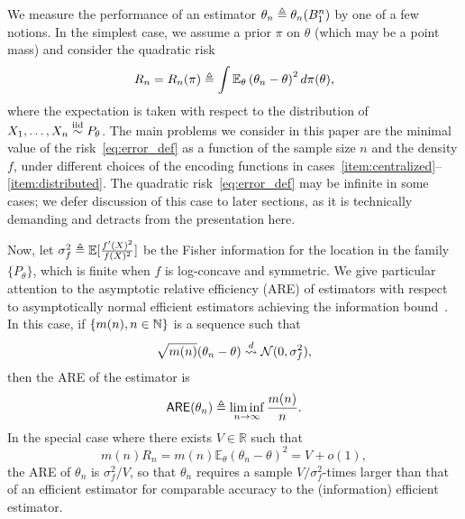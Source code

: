 We measure the performance of an estimator $\theta_n \triangleq
\theta_n(B_1^n)$ by one of a few notions. In the simplest case,
we assume a prior $\pi$ on $\theta$ (which may be a point
mass) and consider the quadratic risk
\begin{equation}
  \label{eq:error_def}
  R_n = R_n(\pi) \triangleq \int \mathbb{E}_\theta\left({\theta}_n - \theta \right)^2
  d\pi(\theta),
\end{equation}
where the expectation is taken with respect to the distribution of
$X_1,\ldots,X_n \stackrel{\textup{iid}}{\sim} P_\theta$.  The main problems we consider in this
paper are the minimal value of the risk~\eqref{eq:error_def} as a function
of the sample size $n$ and the density $f$, under different choices of the
encoding functions in
cases~\eqref{item:centralized}--\eqref{item:distributed}.
The quadratic risk~\eqref{eq:error_def} may be infinite in some cases;
we defer discussion of this case to later sections, as it is technically
demanding and detracts from the presentation here.

Now, let $\sigma_f^2 \triangleq \mathbb{E}[\frac{f'(X)^2}{f(X)^2}]$ be the Fisher
information for the location in the family $\{P_\theta\}$, which is finite
when $f$ is log-concave and symmetric. We give particular attention to the
asymptotic relative efficiency (ARE) of estimators with respect to
asymptotically normal efficient estimators achieving the information
bound~\cite{VanDerVaart98}. In this case,
if $\{m(n), n \in \mathbb{N}\}$ is a sequence such that
\begin{equation*}
  \sqrt{m(n)} (\theta_n - \theta) \stackrel{d}{\rightsquigarrow} \mathcal{N}(0, \sigma_f^2),
\end{equation*}
then the ARE of the estimator is~\cite[Def.~6.6.6]{LehmannCa98}
\begin{equation*}
  \mathsf{ARE}({\theta}_n) \triangleq
  \liminf_{n\rightarrow \infty} \frac{m(n)}{n}.
\end{equation*}
In the special case where there exists $V \in \mathbb R$ such that
\begin{equation*}
m(n) R_n =
m(n) \mathbb E_\theta\left({\theta}_n - \theta \right)^2 = V + o(1),
\end{equation*}
the ARE of ${\theta}_n$ is $\sigma_f^2/V$, so that $\theta_n$ requires a
sample $V / \sigma_f^2$-times larger than that of an efficient estimator for
comparable accuracy to the (information) efficient estimator.




